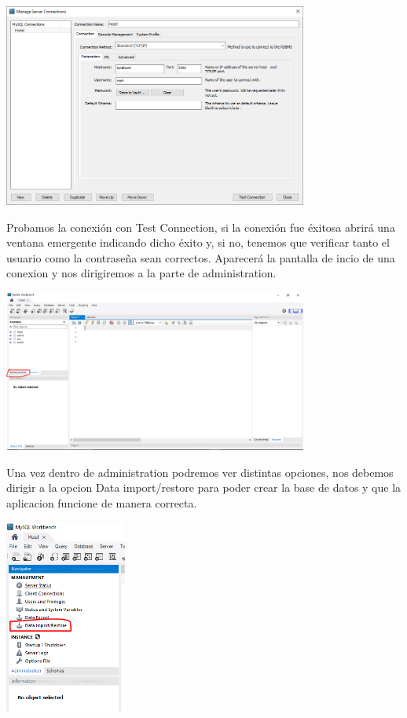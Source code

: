 \documentclass[12pt]{article}
\begin{document}
\begin{flushleft}
\vspace{0.5cm}
\begin{center}
\includegraphics[width=10cm]{usuario.png}
\end{center}

\vspace{0.5cm}
\textsf{Probamos la conexión con Test Connection, si la conexión fue éxitosa abrirá una ventana emergente indicando dicho éxito y, si no, tenemos que verificar tanto el usuario como la contraseña sean correctos. Aparecerá la pantalla de incio de una conexion y nos dirigiremos a la parte de administration.}

\vspace{0.5cm}
\begin{center}
\includegraphics[width=10cm]{Johan1.png} 
\end{center}
\vspace{0.5cm}

\textsf{Una vez dentro de administration podremos ver distintas opciones, nos debemos dirigir a la opcion Data import/restore para poder crear la base de datos y que la aplicacion funcione de manera correcta.}

\vspace{0.5cm}
\begin{center}
\includegraphics[width=4cm]{Johan2.png} 
\end{center}
\vspace{0.5cm}


\end{flushleft}
\end{document}
